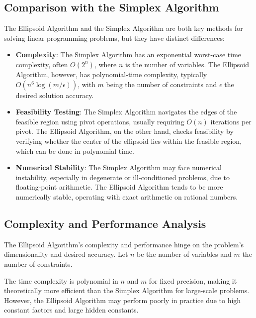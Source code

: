 \documentclass[12pt]{book} %
\begin{document}
\subsection{Comparison with the Simplex Algorithm}

The Ellipsoid Algorithm and the Simplex Algorithm are both key methods for solving linear programming problems, but they have distinct differences:

\begin{itemize}
    \item \textbf{Complexity}: The Simplex Algorithm has an exponential worst-case time complexity, often \(O(2^n)\), where \(n\) is the number of variables. The Ellipsoid Algorithm, however, has polynomial-time complexity, typically \(O(n^6 \log(m/\epsilon))\), with \(m\) being the number of constraints and \(\epsilon\) the desired solution accuracy.
    
    \item \textbf{Feasibility Testing}: The Simplex Algorithm navigates the edges of the feasible region using pivot operations, usually requiring \(O(n)\) iterations per pivot. The Ellipsoid Algorithm, on the other hand, checks feasibility by verifying whether the center of the ellipsoid lies within the feasible region, which can be done in polynomial time.
    
    \item \textbf{Numerical Stability}: The Simplex Algorithm may face numerical instability, especially in degenerate or ill-conditioned problems, due to floating-point arithmetic. The Ellipsoid Algorithm tends to be more numerically stable, operating with exact arithmetic on rational numbers.
\end{itemize}

\subsection{Complexity and Performance Analysis}

The Ellipsoid Algorithm's complexity and performance hinge on the problem's dimensionality and desired accuracy. Let \(n\) be the number of variables and \(m\) the number of constraints.

The time complexity is polynomial in \(n\) and \(m\) for fixed precision, making it theoretically more efficient than the Simplex Algorithm for large-scale problems. However, the Ellipsoid Algorithm may perform poorly in practice due to high constant factors and large hidden constants.
\end{document}
